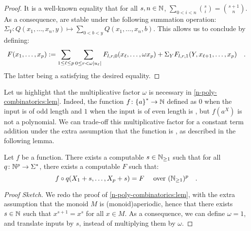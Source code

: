 \begin{proof}
   It is a well-known equality that for all $s,n \in \mathbb{N}$,
   $\sum_{0 < i < n} \binom{s}{i} = \binom{s+1}{n}$.
   As a consequence,  are
   stable under the following summation operation:
   $\Sigma_Y \colon Q(x_1,\dots,x_n,y) \mapsto \sum_{0 < b < y} Q(x_1, \dots, x_n, b)$.
   This allows us to conclude by defining:
   \begin{equation*}
       F(x_1, \dots, x_p) \defined
       \sum_{1 \leq \ell \leq p} \sum_{0 \leq r < \omega \card{u_\ell}}
       F_{l,r,0}(x_{\ell}, \dots, \omega x_p) + \Sigma_Y F_{l,r,1}(Y,
       x_{\ell+1}, \dots, x_p)
       \quad .
   \end{equation*}
   The latter being a  satisfying
   the desired equality.

\end{proof}

Let us highlight that the multiplicative factor $\omega$ is necessary in
\cref{n-poly-combinatorics:lem}. Indeed, the function $f \colon \mathopen{\{} a \mathclose{\}}^* \to
\mathbb{N}$ defined as $0$ when the input is of odd length and $1$ when the input is
of even length is , but $f(a^X)$ is not a polynomial.
We can trade-off this multiplicative factor for a constant term 
addition under the extra assumption that the function 
is , as described in the following lemma.

\begin{lemma}
    \label{n-sf-combinatorics:lem}
    Let $f$ be a  function. 
    There exists a computable $s \in \mathbb{N}_{\geq 1}$
    such that for all 
    $q \colon \mathbb{N}^p \to \Sigma^*$,
    there exists a computable  $F$
    such that:
    \begin{equation*}
        f \circ q(X_1 + s, \dots, X_p + s)
        =
        F
        \quad 
        \text{ over } (\mathbb{N}_{\geq 1})^p
        \quad .
    \end{equation*}
\end{lemma}
\begin{proof}[Proof Sketch]
    We redo the proof of \cref{n-poly-combinatorics:lem}, with the extra
    assumption that the monoid $M$ is \kl(monoid){aperiodic}, hence that there
    exists $s \in \mathbb{N}$ such that $x^{s+1} = x^s$ for all $x \in M$. As a
    consequence, we can define $\omega = 1$, and
    translate inputs by $s$, instead of multiplying them by $\omega$.
\end{proof}

